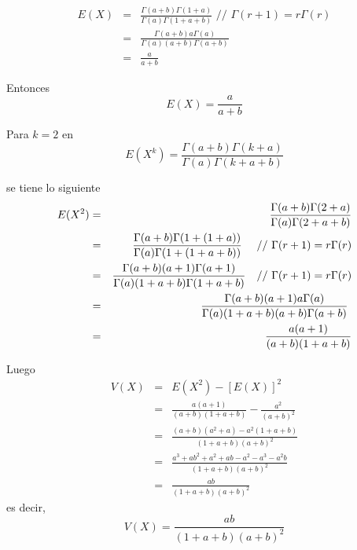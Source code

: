 \begin{i}
\begin{eqnarray*}
E(X) &=&\frac{\Gamma (a+b)\Gamma (1+a)}{\Gamma (a)\Gamma (1+a+b)}\text{ \ // 
}\Gamma (r+1)=r\Gamma (r) \\
&=&\frac{\Gamma (a+b)a\Gamma (a)}{\Gamma (a)(a+b)\Gamma (a+b)} \\
&=&\frac{a}{a+b}
\end{eqnarray*}

Entonces 
\begin{equation*}
E(X)=\frac{a}{a+b}
\end{equation*}

Para $k=2$ en
\begin{equation*}
E(X^{k})=\frac{\Gamma (a+b)\Gamma (k+a)}{\Gamma (a)\Gamma (k+a+b)}
\end{equation*}

se tiene lo siguiente
\begin{eqnarray*}
E(X^{2}) &=&\frac{\Gamma (a+b)\Gamma (2+a)}{\Gamma (a)\Gamma (2+a+b)} \\
&=&\frac{\Gamma (a+b)\Gamma (1+(1+a))}{\Gamma (a)\Gamma (1+(1+a+b))}\text{ \
\ \ // }\Gamma (r+1)=r\Gamma (r) \\
&=&\frac{\Gamma (a+b)(a+1)\Gamma (a+1)}{\Gamma (a)(1+a+b)\Gamma (1+a+b)}%
\text{ \ \ // }\Gamma (r+1)=r\Gamma (r) \\
&=&\frac{\Gamma (a+b)(a+1)a\Gamma (a)}{\Gamma (a)(1+a+b)(a+b)\Gamma (a+b)}%
\text{ } \\
&=&\frac{a(a+1)}{(a+b)(1+a+b)}
\end{eqnarray*}

Luego 
\begin{eqnarray*}
V(X) &=&E(X^{2})-[E(X)]^{2} \\
&=&\frac{a(a+1)}{(a+b)(1+a+b)}-\frac{a^{2}}{(a+b)^{2}} \\
&=&\frac{(a+b)(a^{2}+a)-a^{2}(1+a+b)}{(1+a+b)(a+b)^{2}} \\
&=&\frac{a^{3}+ab^{2}+a^{2}+ab-a^{2}-a^{3}-a^{2}b}{(1+a+b)(a+b)^{2}} \\
&=&\frac{ab}{(1+a+b)(a+b)^{2}}
\end{eqnarray*}
es decir,
\begin{equation*}
V(X)=\frac{ab}{(1+a+b)(a+b)^{2}}
\end{equation*}


\end{i}
